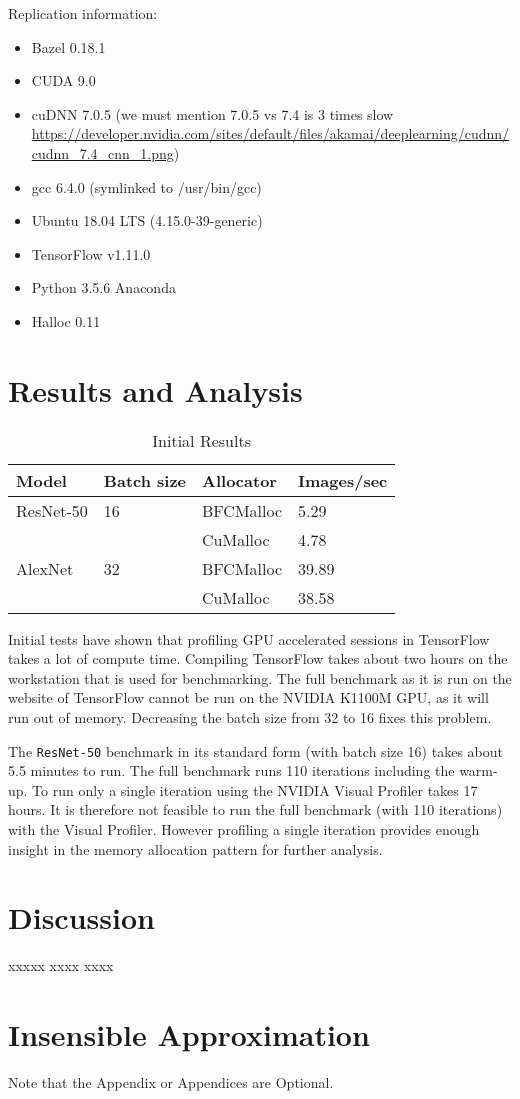 \documentclass[12pt,twoside]{article}
\begin{document}
Replication information:
\begin{itemize}
    \item Bazel 0.18.1
    \item CUDA 9.0
    \item cuDNN 7.0.5 (we must mention 7.0.5 vs 7.4 is 3 times slow \url{https://developer.nvidia.com/sites/default/files/akamai/deeplearning/cudnn/cudnn_7.4_cnn_1.png})
    \item gcc 6.4.0 (symlinked to /usr/bin/gcc)
    \item Ubuntu 18.04 LTS (4.15.0-39-generic)
    \item TensorFlow v1.11.0
    \item Python 3.5.6 Anaconda
    \item Halloc 0.11
\end{itemize}




\section{Results and Analysis}
\label{sec:results-and-analysis}

\begin{table}[!ht]
\centering
\caption{Initial Results}
\label{tab:results}
\begin{tabular}{|l|l|l|l|}
\hline
Model     & Batch size & Allocator & Images/sec \\ \hline
ResNet-50 & 16         & BFCMalloc & 5.29       \\ \cline{3-4} 
          &            & CuMalloc  & 4.78       \\ \hline
AlexNet   & 32         & BFCMalloc & 39.89      \\ \cline{3-4} 
          &            & CuMalloc  & 38.58      \\ \hline
\end{tabular}
\end{table}

Initial tests have shown that profiling GPU accelerated sessions in TensorFlow takes a lot of compute time. Compiling TensorFlow takes about two hours on the workstation that is used for benchmarking. The full benchmark as it is run on the website of TensorFlow cannot be run on the NVIDIA K1100M GPU, as it will run out of memory. Decreasing the batch size from 32 to 16 fixes this problem.

The \texttt{ResNet-50} benchmark in its standard form (with batch size 16) takes about 5.5 minutes to run. The full benchmark runs 110 iterations including the warm-up. To run only a single iteration using the NVIDIA Visual Profiler takes 17 hours. It is therefore not feasible to run the full benchmark (with 110 iterations) with the Visual Profiler. However profiling a single iteration provides enough insight in the memory allocation pattern for further analysis.

\section{Discussion}
\label{sec:discussion}
xxxxx xxxx xxxx 



\appendix
\section{Insensible Approximation}

Note that the Appendix or Appendices are Optional.
\end{document}
